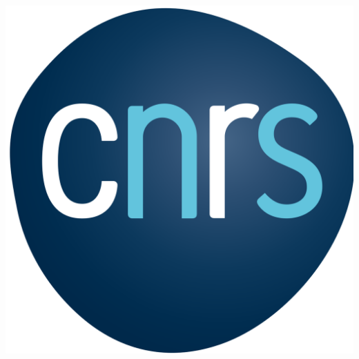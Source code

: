 \documentclass[11pt, a4paper]{article}
\begin{document}
\begin{task}
\begin{gridlayout}{\textwidth}{15cm}
\begin{row}{0.3}
\begin{cell}{0.5}
                \includegraphics[width=\cellwidth]{img/logo-cnrs.png}
            \end{cell}
        \end{row}
    \end{gridlayout}
\logoguidesofdoctwo
\end{task}
\end{document}
